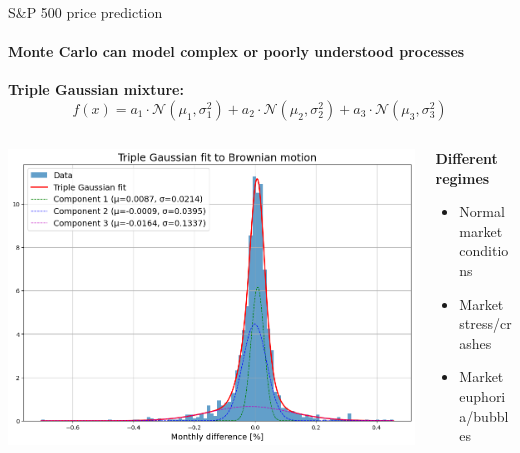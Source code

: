 \documentclass{beamer}
\begin{document}
\begin{frame}{S\&P 500 price prediction}
  \framesubtitle{Monte Carlo can model complex or poorly understood processes}

  \textbf{Triple Gaussian mixture:}
  $$f(x) = a_1 \cdot \mathcal{N}(\mu_1, \sigma_1^2) + a_2 \cdot \mathcal{N}(\mu_2, \sigma_2^2) + a_3 \cdot \mathcal{N}(\mu_3, \sigma_3^2)$$

  \begin{columns}[c]
  \begin{column}{0.6\textwidth}
    \includegraphics[width=\textwidth]{images/triple_gauss.png}
  \end{column}
  \begin{column}{0.4\textwidth}
    \textbf{Different regimes}
    \begin{itemize}
      \item Normal market conditions
      \item Market stress/crashes
      \item Market euphoria/bubbles
    \end{itemize}
  \end{column}
  \end{columns}
\end{frame}
\end{document}
